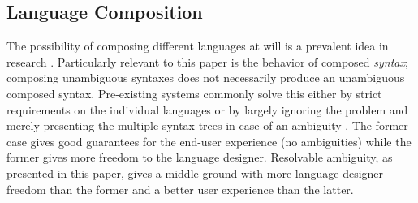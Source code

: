 \documentclass[runningheads]{llncs}
\begin{document}


\subsection{Language Composition}

The possibility of composing different languages at will is a prevalent idea in research \cite{vanwykSilverExtensibleAttribute2010,lorenzenSoundTypedependentSyntactic2016,danielssonParsingMixfixOperators2011}. Particularly relevant to this paper is the behavior of composed \emph{syntax}; composing unambiguous syntaxes does not necessarily produce an unambiguous composed syntax. Pre-existing systems commonly solve this either by strict requirements on the individual languages \cite{vanwykSilverExtensibleAttribute2010} or by largely ignoring the problem and merely presenting the multiple syntax trees in case of an ambiguity \cite{lorenzenSoundTypedependentSyntactic2016,danielssonParsingMixfixOperators2011}. The former case gives good guarantees for the end-user experience (no ambiguities) while the former gives more freedom to the language designer. Resolvable ambiguity, as presented in this paper, gives a middle ground with more language designer freedom than the former and a better user experience than the latter.
\end{document}
